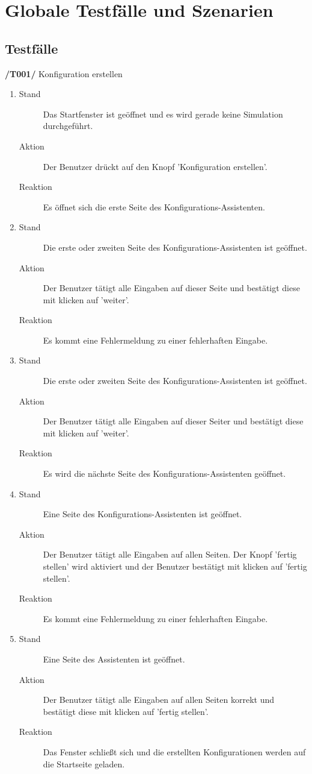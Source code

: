 
\section{Globale Testfälle und Szenarien}

  
\newcommand{\testfall}[4][]{
  \begin{description}
    \item[Stand] #2
    \item[Aktion] #3
    \item[Reaktion] #4
  \end{description}
}

\subsection{Testfälle}



\textbf{/T001/} Konfiguration erstellen
\begin{enumerate}
\item \testfall{Das Startfenster ist geöffnet und es wird gerade keine Simulation durchgeführt.}
{Der Benutzer drückt auf den Knopf 'Konfiguration erstellen'.}
{Es öffnet sich die erste Seite des Konfigurations-Assistenten.}

\item \testfall{Die erste oder zweiten Seite des Konfigurations-Assistenten ist geöffnet.}
{Der Benutzer tätigt alle Eingaben auf dieser Seite und bestätigt diese mit klicken auf 'weiter'.}
{Es kommt eine Fehlermeldung zu einer fehlerhaften Eingabe.}

\item \testfall{Die erste oder zweiten Seite des Konfigurations-Assistenten ist geöffnet.}
{Der Benutzer tätigt alle Eingaben auf dieser Seiter und bestätigt diese mit klicken auf 'weiter'.}
{Es wird die nächste Seite des Konfigurations-Assistenten geöffnet.}

\item \testfall{Eine Seite des Konfigurations-Assistenten ist geöffnet.}
{Der Benutzer tätigt alle Eingaben auf allen Seiten. Der Knopf 'fertig stellen' wird aktiviert und der Benutzer bestätigt mit klicken auf 'fertig stellen'.}
{Es kommt eine Fehlermeldung zu einer fehlerhaften Eingabe.}

\item \testfall{Eine Seite des Assistenten ist geöffnet.}
{Der Benutzer tätigt alle Eingaben auf allen Seiten korrekt und bestätigt diese mit klicken auf 'fertig stellen'.}
{Das Fenster schließt sich und die erstellten Konfigurationen werden auf die Startseite geladen.}


\end{enumerate}

